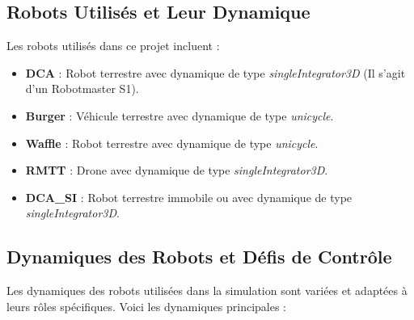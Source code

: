\documentclass[a4paper,12pt]{article}
\begin{document}
\subsection*{Robots Utilisés et Leur Dynamique}
Les robots utilisés dans ce projet incluent :
\begin{itemize}
    \item \textbf{DCA} : Robot terrestre avec dynamique de type \textit{singleIntegrator3D} (Il s'agit d'un Robotmaster S1).
    \item \textbf{Burger} : Véhicule terrestre avec dynamique de type \textit{unicycle}.
    \item \textbf{Waffle} : Robot terrestre avec dynamique de type \textit{unicycle}.
    \item \textbf{RMTT} : Drone avec dynamique de type \textit{singleIntegrator3D}.
    \item \textbf{DCA\_SI} : Robot terrestre immobile ou avec dynamique de type \textit{singleIntegrator3D}.
\end{itemize}

\subsection*{Dynamiques des Robots et Défis de Contrôle}
Les dynamiques des robots utilisées dans la simulation sont variées et adaptées à leurs rôles spécifiques. Voici les dynamiques principales :
\end{document}
